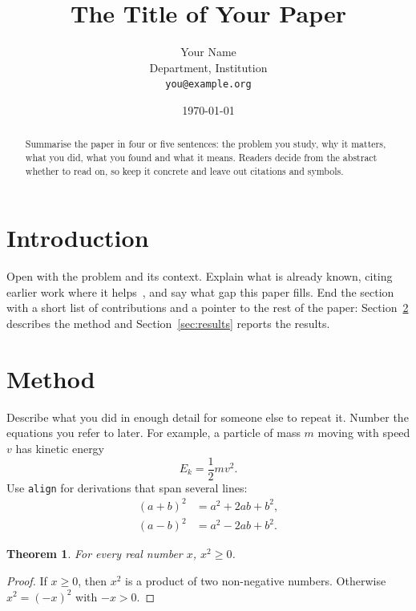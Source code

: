 \documentclass[11pt]{article}
\title{The Title of Your Paper}
\author{Your Name \\ \small Department, Institution \\ \small \texttt{you@example.org}}
\date{\today}
\newtheorem{theorem}{Theorem}
\begin{document}
\maketitle

\begin{abstract}
Summarise the paper in four or five sentences: the problem you study, why
it matters, what you did, what you found and what it means. Readers decide
from the abstract whether to read on, so keep it concrete and leave out
citations and symbols.
\end{abstract}

\section{Introduction}
\label{sec:intro}

Open with the problem and its context. Explain what is already known,
citing earlier work where it helps~\cite{knuth1984, author2024journal},
and say what gap this paper fills. End the section with a short list of
contributions and a pointer to the rest of the paper: Section~\ref{sec:method}
describes the method and Section~\ref{sec:results} reports the results.

\section{Method}
\label{sec:method}

Describe what you did in enough detail for someone else to repeat it.
Number the equations you refer to later. For example, a particle of mass
$m$ moving with speed $v$ has kinetic energy
\begin{equation}
  E_k = \frac{1}{2} m v^2 .
  \label{eq:energy}
\end{equation}
Use \texttt{align} for derivations that span several lines:
\begin{align}
  (a + b)^2 &= a^2 + 2ab + b^2 , \label{eq:square} \\
  (a - b)^2 &= a^2 - 2ab + b^2 .
\end{align}

\begin{theorem}
\label{thm:square}
For every real number $x$, $x^2 \geq 0$.
\end{theorem}

\begin{proof}
If $x \geq 0$, then $x^2$ is a product of two non-negative numbers.
Otherwise $x^2 = (-x)^2$ with $-x > 0$.
\end{proof}
\end{document}
